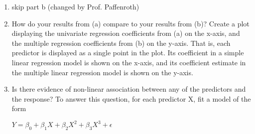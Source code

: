 \begin{enumerate}
\begin{enumerate}

    \item
    skip
    part
    b
    (changed
     by
     Prof.
     Paffenroth)

    \item
    How
    do
    your
    results
    from
(a)
    compare
    to
    your
    results
    from
    (b)?
    Create
    a
    plot
    displaying
    the
    univariate
    regression
    coefficients
    from
(a)
    on
    the
    x-axis,
    and
    the
    multiple
    regression
    coefficients
    from
(b)
    on
    the
    y-axis.
    That
    is,
    each
    predictor
    is
    displayed
    as
    a
    single
    point
    in
    the
    plot.
    Its
    coefficient
    in
    a
    simple
    linear
    regression
    model
    is
    shown
    on
    the
    x-axis,
    and
    its
    coefficient
    estimate
    in
    the
    multiple
    linear
    regression
    model
    is
    shown
    on
    the
    y-axis.
    \\


    \item
    Is
    there
    evidence
    of
    non-linear
    association
    between
    any
    of
    the
    predictors
    and
    the
    response?
    To
    answer
    this
    question,
    for
    each
    predictor
    X,
    fit
    a
    model
    of
    the
    form
    \begin{center} 
    $Y
    =
    \beta_0
    +
    \beta_1X
    +
    \beta_2X^2
    +
    \beta_3X^3
    +
    \epsilon$ 
    \end{center}


    \end{enumerate}

    \end{enumerate}

    




